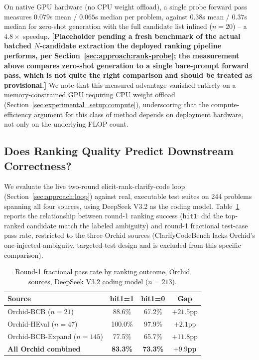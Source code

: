 On native GPU hardware (no CPU weight offload), a single probe forward pass
measures $0.079$s mean / $0.065$s median per problem, against $0.38$s mean
/ $0.37$s median for zero-shot generation with the full candidate list
inlined ($n{=}20$) -- a $4.8\times$ speedup. \textbf{[Placeholder pending a
fresh benchmark of the actual batched $N$-candidate extraction the deployed
ranking pipeline performs, per Section~\ref{sec:approach:rank-probe}; the
measurement above compares zero-shot generation to a single bare-prompt
forward pass, which is not quite the right comparison and should be treated
as provisional.]} We note that this measured advantage vanished entirely on
a memory-constrained GPU requiring CPU weight offload
(Section~\ref{sec:experimental_setup:compute}), underscoring that the
compute-efficiency argument for this class of method depends on deployment
hardware, not only on the underlying FLOP count.

\subsection{Does Ranking Quality Predict Downstream Correctness?}
\label{sec:results:correctness}

We evaluate the live two-round elicit-rank-clarify-code loop
(Section~\ref{sec:approach:loop}) against real, executable test suites on
244 problems spanning all four sources, using DeepSeek V3.2 as the coding
model. Table~\ref{tab:hit-vs-pass} reports the relationship between
round-1 ranking success (\texttt{hit1}: did the top-ranked candidate match
the labeled ambiguity) and round-1 fractional test-case pass rate,
restricted to the three Orchid sources (ClarifyCodeBench lacks Orchid's
one-injected-ambiguity, targeted-test design and is excluded from this
specific comparison).

\begin{table}[htbp]
\caption{Round-1 fractional pass rate by ranking outcome, Orchid sources, DeepSeek V3.2 coding model ($n{=}213$).}
\label{tab:hit-vs-pass}
\centering
\begin{tabular}{lccc}
\toprule
Source & hit1=1 & hit1=0 & Gap \\
\midrule
Orchid-BCB ($n{=}21$) & 88.6\% & 67.2\% & $+21.5$pp \\
Orchid-HEval ($n{=}47$) & 100.0\% & 97.9\% & $+2.1$pp \\
Orchid-BCB-Expand ($n{=}145$) & 77.5\% & 65.7\% & $+11.8$pp \\
\textbf{All Orchid combined} & \textbf{83.3\%} & \textbf{73.3\%} & \textbf{$+9.9$pp} \\
\bottomrule
\end{tabular}
\end{table}

